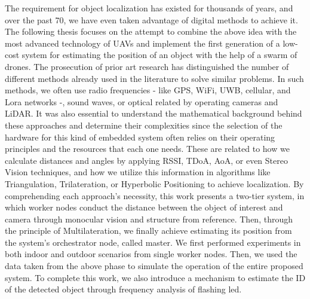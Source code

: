 \begin{extraAbstract}
	\addchaptertocentry{\abstractname} %
	
	The requirement for object localization has existed for thousands of years, and over the past 70, we have even taken advantage of digital methods to achieve it.
The following thesis focuses on the attempt to combine the above idea with the most advanced technology of UAVs and implement the first generation of a low-cost system for estimating the position of an object with the help of a swarm of drones.
The prosecution of prior art research has distinguished the number of different methods already used in the literature to solve similar problems.
In such methods, we often use radio frequencies - like GPS, WiFi, UWB, cellular, and Lora networks -, sound waves, or optical related by operating cameras and LiDAR.
It was also essential to understand the mathematical background behind these approaches and determine their complexities since the selection of the hardware for this kind of embedded system often relies on their operating principles and the resources that each one needs.
 These are related to how we calculate distances and angles by applying RSSI, TDoA, AoA, or even Stereo Vision techniques, and how we utilize this information in algorithms like Triangulation, Trilateration, or Hyperbolic Positioning to achieve localization.
By comprehending each approach’s necessity, this work presents a two-tier system, in which worker nodes conduct the distance between the object of interest and camera through monocular vision and structure from reference. Then, through the principle of Multilateration, we finally achieve estimating its position from the system’s orchestrator node, called master.
We first performed experiments in both indoor and outdoor scenarios from single worker nodes. Then, we used the data taken from the above phase to simulate the operation of the entire proposed system. To complete this work, we also introduce a mechanism to estimate the ID of the detected object through frequency analysis of flashing led.
\end{extraAbstract}
